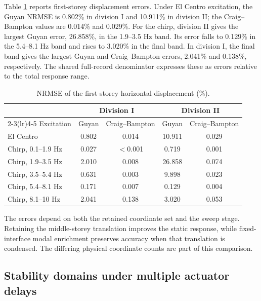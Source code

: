 \documentclass[a4paper,fleqn,review,12pt]{cas-sc}
\numberwithin{equation}{section}
\newcommand{\rev}[1]{{\color{red}#1}}
\begin{document}
\rev{Table \ref{tab:nrmse} reports first-storey displacement errors. Under El Centro excitation, the Guyan NRMSE is 0.802\% in division I and 10.911\% in division II; the Craig--Bampton values are 0.014\% and 0.029\%. For the chirp, division II gives the largest Guyan error, 26.858\%, in the 1.9--3.5 Hz band. Its error falls to 0.129\% in the 5.4--8.1 Hz band and rises to 3.020\% in the final band. In division I, the final band gives the largest Guyan and Craig--Bampton errors, 2.041\% and 0.138\%, respectively. The shared full-record denominator expresses these as errors relative to the total response range.}

\begin{table}[htbp]
	\centering
	\caption{NRMSE of the first-storey horizontal displacement (\%).}
	\label{tab:nrmse}
	\begin{tabular}{lcccc}
		\toprule
		& \multicolumn{2}{c}{Division I} & \multicolumn{2}{c}{Division II}\\
		\cmidrule(lr){2-3}\cmidrule(lr){4-5}
		Excitation & Guyan & Craig--Bampton & Guyan & Craig--Bampton\\
		\midrule
		El Centro           & \rev{0.802}& \rev{0.014}& \rev{10.911}& \rev{0.029}\\
		\midrule
		Chirp, 0.1--1.9 Hz  & \rev{0.027}& $<$0.001& \rev{0.719}& \rev{0.001}\\
		Chirp, 1.9--3.5 Hz  & \rev{2.010}& 0.008& \rev{26.858}& \rev{0.074}\\
		Chirp, 3.5--5.4 Hz  & \rev{0.631}& 0.003& \rev{9.898}& \rev{0.023}\\
		Chirp, 5.4--8.1 Hz  & \rev{0.171}& \rev{0.007}& \rev{0.129}& \rev{0.004}\\
		Chirp, 8.1--10 Hz   & \rev{2.041}& \rev{0.138}& \rev{3.020}& \rev{0.053}\\
		\bottomrule
	\end{tabular}
\end{table}

\rev{The errors depend on both the retained coordinate set and the sweep stage. Retaining the middle-storey translation improves the static response, while fixed-interface modal enrichment preserves accuracy when that translation is condensed. The differing physical coordinate counts are part of this comparison.}

\subsection{Stability domains under multiple actuator delays}
\label{sec:stability-domains}
\end{document}
